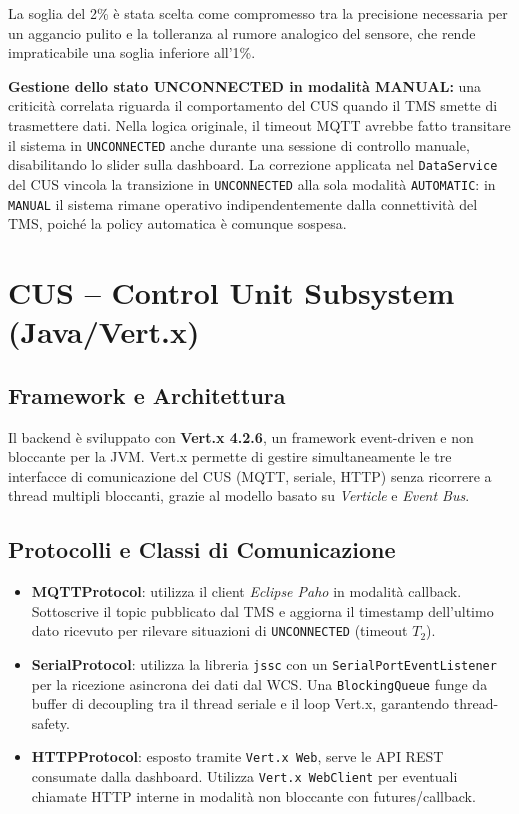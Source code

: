 \documentclass[12pt, a4paper]{article}
\begin{document}
La soglia del 2\% è stata scelta come compromesso tra la precisione necessaria per un aggancio pulito e la tolleranza al rumore analogico del sensore, che rende impraticabile una soglia inferiore all'1\%.

\textbf{Gestione dello stato UNCONNECTED in modalità MANUAL:} una criticità correlata riguarda il comportamento del CUS quando il TMS smette di trasmettere dati. Nella logica originale, il timeout MQTT avrebbe fatto transitare il sistema in \texttt{UNCONNECTED} anche durante una sessione di controllo manuale, disabilitando lo slider sulla dashboard. La correzione applicata nel \texttt{DataService} del CUS vincola la transizione in \texttt{UNCONNECTED} alla sola modalità \texttt{AUTOMATIC}: in \texttt{MANUAL} il sistema rimane operativo indipendentemente dalla connettività del TMS, poiché la policy automatica è comunque sospesa.

\section{CUS -- Control Unit Subsystem (Java/Vert.x)}

\subsection{Framework e Architettura}

Il backend è sviluppato con \textbf{Vert.x 4.2.6}, un framework event-driven e non bloccante per la JVM. Vert.x permette di gestire simultaneamente le tre interfacce di comunicazione del CUS (MQTT, seriale, HTTP) senza ricorrere a thread multipli bloccanti, grazie al modello basato su \textit{Verticle} e \textit{Event Bus}.

\subsection{Protocolli e Classi di Comunicazione}

\begin{itemize}
    \item \textbf{MQTTProtocol}: utilizza il client \textit{Eclipse Paho} in modalità callback. Sottoscrive il topic pubblicato dal TMS e aggiorna il timestamp dell'ultimo dato ricevuto per rilevare situazioni di \texttt{UNCONNECTED} (timeout $T_2$).

    \item \textbf{SerialProtocol}: utilizza la libreria \texttt{jssc} con un \texttt{SerialPortEventListener} per la ricezione asincrona dei dati dal WCS. Una \texttt{BlockingQueue} funge da buffer di decoupling tra il thread seriale e il loop Vert.x, garantendo thread-safety.

    \item \textbf{HTTPProtocol}: esposto tramite \texttt{Vert.x Web}, serve le API REST consumate dalla dashboard. Utilizza \texttt{Vert.x WebClient} per eventuali chiamate HTTP interne in modalità non bloccante con futures/callback.
\end{itemize}
\end{document}
